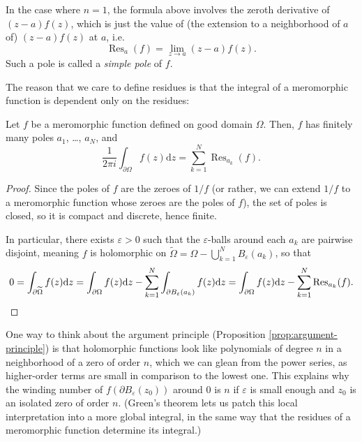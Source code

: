 \documentclass[10pt]{article}
\renewcommand{\tilde}{\widetilde}
\providecommand{\eps}{\varepsilon}
\providecommand{\dd}{\mathrm d}
\providecommand{\opname}{\operatorname}
\providecommand{\res}{\opname{Res}}
\providecommand{\vocab}[1]{{{\sffamily\textit{#1}}}}
\begin{document}
In the case where $n = 1$, the formula above involves
the zeroth derivative of $(z-a)f(z)$, which is just
the value of (the extension to a neighborhood of $a$ of)
$(z-a)f(z)$ at $a$, i.e.
\begin{equation*}
    \res_a(f) = \lim_{z\to a}(z-a)f(z).
\end{equation*}
Such a pole is called a \vocab{simple pole} of $f$.

The reason that we care to define residues is that
the integral of a meromorphic function is dependent
only on the residues:
\begin{theorem}
    \label{thm:residue-theorem}
    Let $f$ be a meromorphic function defined on good domain $\Omega$.
    Then, $f$ has finitely many poles $a_1$, \dots, $a_N$, and
    \begin{equation*}
	\frac 1{2\pi i}\int_{\partial\Omega}f(z)\dd z
	= \sum_{k=1}^N\res_{a_k}(f).
    \end{equation*}
\end{theorem}

\begin{proof}
    Since the poles of $f$ are the zeroes of $1/f$
    (or rather, we can extend $1/f$ to a meromorphic function
    whose zeroes are the poles of $f$), the set of poles is closed,
    so it is compact and discrete, hence finite.

    In particular, there exists $\eps>0$ such that
    the $\eps$-balls around each $a_k$ are pairwise disjoint,
    meaning $f$ is holomorphic on
    $\tilde\Omega = \Omega - \bigcup_{k=1}^NB_\eps(a_k)$, so that
    \begin{equation*}
	0 = \int_{\partial\tilde\Omega}
	f(z)\dd z = \int_{\partial\Omega}f(z)\dd z
	- \sum_{k=1}^N \int_{\partial B_\eps(a_k)} f(z)\dd z
	= \int_{\partial\Omega}f(z)\dd z
	- \sum_{k=1}^N \res_{a_k}(f).\qedhere
    \end{equation*}
\end{proof}


One way to think about the argument principle
(Proposition \ref{prop:argument-principle})
is that holomorphic functions look like polynomials of degree $n$
in a neighborhood of a zero of order $n$,
which we can glean from the power series,
as higher-order terms are small in comparison to the lowest one.
This explains why the winding number of $f(\partial B_\eps(z_0))$
around $0$ is $n$ if $\eps$ is small enough
and $z_0$ is an isolated zero of order $n$.
(Green's theorem lets us patch this local interpretation
into a more global integral, in the same way that
the residues of a meromorphic function determine its integral.)
\end{document}

